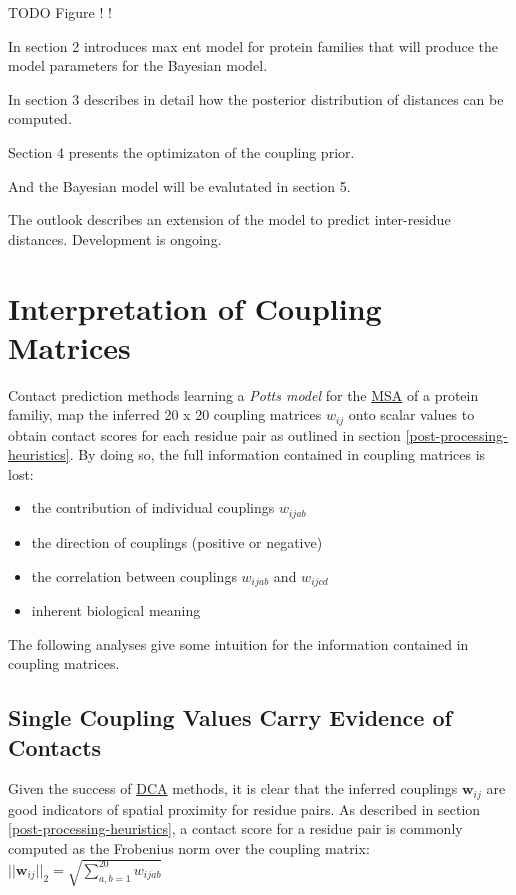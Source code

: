 \documentclass[12pt,a4paper,twoside]{book}
\providecommand{\tightlist}{%
  \setlength{\itemsep}{0pt}\setlength{\parskip}{0pt}}
\newcommand{\wij}{\mathbf{w}_{ij}}
\newcommand{\wijab}{w_{ijab}}
\newcommand{\wijcd}{w_{ijcd}}
\theoremstyle{definition}
\theoremstyle{definition}
\theoremstyle{remark}
\begin{document}
TODO Figure ! !

In section 2 introduces max ent model for protein families that will
produce the model parameters for the Bayesian model.

In section 3 describes in detail how the posterior distribution of
distances can be computed.

Section 4 presents the optimizaton of the coupling prior.

And the Bayesian model will be evalutated in section 5.

The outlook describes an extension of the model to predict inter-residue
distances. Development is ongoing.

\chapter{Interpretation of Coupling
Matrices}\label{interpreting-coupling-matrices}

Contact prediction methods learning a \emph{Potts model} for the
\protect\hyperlink{abbrev}{MSA} of a protein familiy, map the inferred
20 x 20 coupling matrices \(w_{ij}\) onto scalar values to obtain
contact scores for each residue pair as outlined in section
\ref{post-processing-heuristics}. By doing so, the full information
contained in coupling matrices is lost:

\begin{itemize}
\tightlist
\item
  the contribution of individual couplings \(\wijab\)
\item
  the direction of couplings (positive or negative)
\item
  the correlation between couplings \(\wijab\) and \(\wijcd\)
\item
  inherent biological meaning
\end{itemize}

The following analyses give some intuition for the information contained
in coupling matrices.

\section{Single Coupling Values Carry Evidence of
Contacts}\label{correlation-between-couplings-and-class}

Given the success of \protect\hyperlink{abbrev}{DCA} methods, it is
clear that the inferred couplings \(\wij\) are good indicators of
spatial proximity for residue pairs. As described in section
\ref{post-processing-heuristics}, a contact score for a residue pair is
commonly computed as the Frobenius norm over the coupling matrix:
\(||\wij||_2 = \sqrt{\sum_{a,b=1}^{20} \wijab}\)
\end{document}
